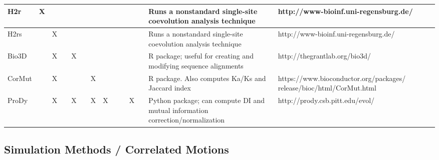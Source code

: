\begin{table}[htbp]
\begin{sideways}
\begin{tabular}{@{}p{2cm}|c|c|c|c|c|c|c|c|c|c|c|p{5cm}|p{5cm}@{}}
    H2r \cite{Merkl2008a} & X &  &  &  &  &  &  &  &  &  &  & Runs a nonstandard single-site coevolution analysis technique & \tiny{http://\mbox{www-bioinf}.uni-regensburg.de/} \\ \hline
    H2rs \cite{Janda2014a} &  & X &  &  &  &  &  &  &  &  &  & Runs a nonstandard single-site coevolution analysis technique & \tiny{http://\mbox{www-bioinf}.uni-regensburg.de/} \\ \hline
    Bio3D \cite{Skjaerven2014} &  & X &  & X &  &  &  &  &  &  &  & R package; useful for creating and modifying sequence alignments & \tiny{http://thegrantlab.org/bio3d/} \\ \hline
    CorMut \cite{Li2014d} &  & X &  &  &  & X &  &  &  &  &  & R package. Also computes Ka/Ks and Jaccard index & \tiny{https://www.bioconductor.org/packages/ release/bioc/html/CorMut.html} \\ \hline
    ProDy \cite{Liu2010,Liu2012} &  & X &  & X &  & X & X &  &  & X &  & Python package; can compute DI and mutual information correction/normalization & \tiny{http://prody.csb.pitt.edu/evol/} \\ \hline
\end{tabular}
\end{sideways}
\end{table}
\clearpage
\subsection{Simulation Methods / Correlated Motions}
